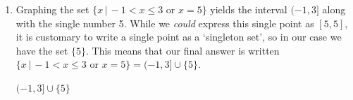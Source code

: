 \documentclass{ximera}
\begin{document}
\begin{example}
\begin{explanation}
\begin{enumerate}
\begin{enumerate}
\begin{center}


\vspace{0.5em}

$(-\infty,-3)\cup(-3,3)\cup(3,\infty)$

\end{center}



\item  Graphing the set $\{ x \, | \, -1 < x \leq 3 \,\, \text{or} \,\, x = 5\}$ yields the interval $(-1,3]$ along with the single number 5.  While we \textit{could} express this single point as $[5,5]$, it is customary to write a single point as a `singleton set', so in our case we have the set $\{ 5\}$. This means that our final answer is written $\{ x \, | \, -1 < x \leq 3 \,\, \text{or} \,\, x = 5\} = (-1,3] \cup \{ 5\}$.


\begin{center}


\vspace{0.5em}

$(-1,3]\cup\{5\}$


\end{center}
\end{enumerate}
\end{enumerate}
\end{explanation}
\end{example}
\end{document}
